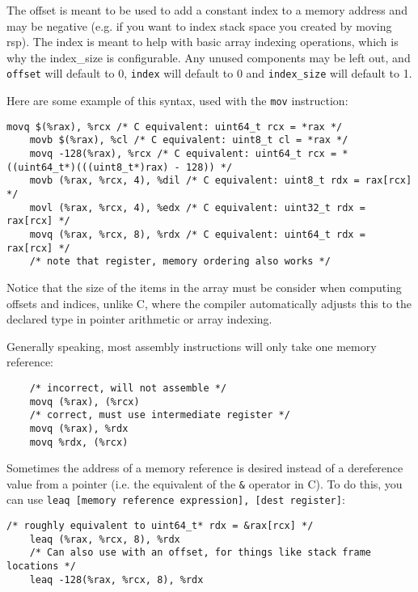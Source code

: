 \documentclass[11pt]{article}
\begin{document}
The offset is meant to be used to add a constant index to a memory address and may be
negative (e.g. if you want to index stack space you created by moving rsp). The index is
meant to help with basic array indexing operations, which is why the index\_size is
configurable. Any unused components may be left out, and \texttt{offset} will default to
0, \texttt{index} will default to 0 and \texttt{index\_size} will default to 1.

Here are some example of this syntax, used with the \texttt{mov} instruction:

\begin{lstlisting}[caption={Accessing memory references}, captionpos=b]
    movq $(%rax), %rcx /* C equivalent: uint64_t rcx = *rax */
    movb $(%rax), %cl /* C equivalent: uint8_t cl = *rax */
    movq -128(%rax), %rcx /* C equivalent: uint64_t rcx = *((uint64_t*)(((uint8_t*)rax) - 128)) */
    movb (%rax, %rcx, 4), %dil /* C equivalent: uint8_t rdx = rax[rcx] */
    movl (%rax, %rcx, 4), %edx /* C equivalent: uint32_t rdx = rax[rcx] */
    movq (%rax, %rcx, 8), %rdx /* C equivalent: uint64_t rdx = rax[rcx] */
    /* note that register, memory ordering also works */
\end{lstlisting}

Notice that the size of the items in the array must be consider when computing offsets
and indices, unlike C, where the compiler automatically adjusts this to the declared type
in pointer arithmetic or array indexing.

Generally speaking, most assembly instructions will only take one memory reference:

\begin{lstlisting}
    /* incorrect, will not assemble */
    movq (%rax), (%rcx)
    /* correct, must use intermediate register */
    movq (%rax), %rdx
    movq %rdx, (%rcx)
\end{lstlisting}

Sometimes the address of a memory reference is desired instead of a dereference value from
a pointer (i.e. the equivalent of the \texttt{\&} operator in C). To do this, you can use
\texttt{leaq [memory reference expression], [dest register]}:

\begin{lstlisting}[caption={\texttt{leaq} instruction example}]
    /* roughly equivalent to uint64_t* rdx = &rax[rcx] */
    leaq (%rax, %rcx, 8), %rdx
    /* Can also use with an offset, for things like stack frame locations */
    leaq -128(%rax, %rcx, 8), %rdx
\end{lstlisting}
\end{document}
